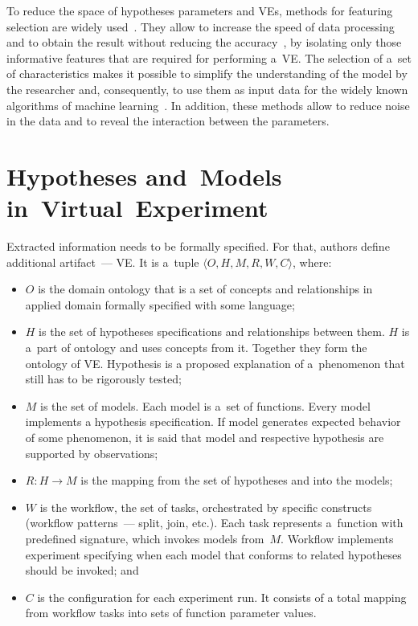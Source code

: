 \begin{multicols}{2}
      To reduce the space of hypotheses parameters and VEs, 
methods for featuring selection are widely used~\cite{14-tar}. They allow to increase 
the speed of data processing and to obtain the result without reducing the 
accuracy~\cite{15-tar}, by isolating only those informative features that are required 
for performing a~VE. The selection of a~set of characteristics makes it 
possible to simplify the understanding of the model by the researcher and, 
consequently, to use them as input data for the widely known algorithms of machine 
learning~\cite{16-tar}. In addition, these methods allow to reduce noise in the data 
and to reveal the interaction between the parameters.



\section{Hypotheses and~Models in~Virtual~Experiment}

      \noindent
Extracted information needs to be formally specified. For that, authors define 
additional artifact~--- VE. It is a~tuple $\langle O, H, M, R, W, 
C\rangle$, where:
      \begin{itemize}
\item $O$ is the domain ontology that is a set of concepts and relationships in 
applied domain formally specified with some language;
\item $H$ is the set of hypotheses specifications and relationships between them. 
$H$ is a~part of ontology and uses concepts from it. Together they form the 
ontology of VE. Hypothesis is a proposed explanation of 
a~phenomenon that still has to be rigorously tested; 
\item $M$ is the set of models. Each model is a~set of functions. Every model 
implements a hypothesis specification. If model generates expected behavior of 
some phenomenon, it is said that model and respective hypothesis are supported 
by observations;
\item $R: H\to M$ is the mapping from the set of hypotheses and into the models;
\item $W$ is the workflow, the set of tasks, orchestrated by specific constructs 
(workflow patterns~--- split, join, etc.). Each task represents a~function with 
predefined signature, which invokes models from~$M$. Workflow implements 
experiment specifying when each model that conforms to related hypotheses 
should be invoked; and 
\item $C$  is the configuration for each experiment run. It consists of a total 
mapping from workflow tasks into sets of function parameter values.
\end{itemize}
      

\end{multicols}
